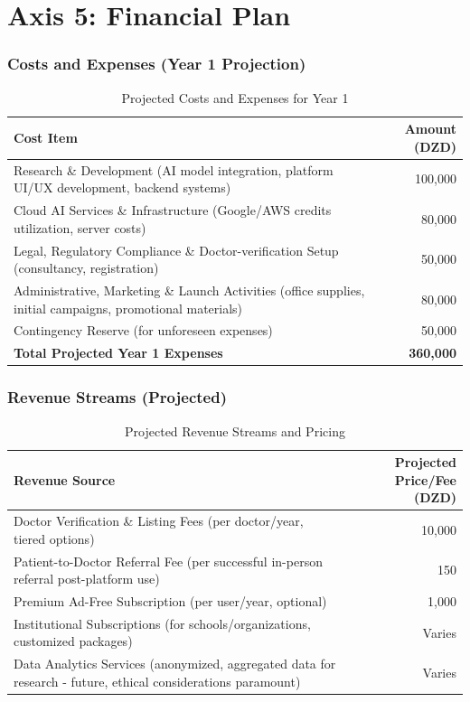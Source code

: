 \chapter{Axis 5: Financial Plan}

\subsection{Costs and Expenses (Year 1 Projection)}
\begin{table}[H]
  \centering
  \caption{Projected Costs and Expenses for Year 1}
  \label{tab:costs_expenses}
  \begin{tabularx}{\linewidth}{@{} X r @{}}
    \toprule
    \rowcolor{Gray}\textbf{Cost Item} & \textbf{Amount (DZD)} \\
    \midrule
    Research \& Development (AI model integration, platform UI/UX development, backend systems) & 100,000 \\
    Cloud AI Services \& Infrastructure (Google/AWS credits utilization, server costs) & 80,000  \\
    Legal, Regulatory Compliance \& Doctor-verification Setup (consultancy, registration) & 50,000  \\
    Administrative, Marketing \& Launch Activities (office supplies, initial campaigns, promotional materials) & 80,000  \\
    Contingency Reserve (for unforeseen expenses) & 50,000  \\
    \midrule
    \rowcolor{Gray}\textbf{Total Projected Year 1 Expenses} & \textbf{360,000} \\
    \bottomrule
  \end{tabularx}
\end{table}

\subsection{Revenue Streams (Projected)}
\begin{table}[H]
  \centering
  \caption{Projected Revenue Streams and Pricing}
  \label{tab:revenue_streams}
  \begin{tabularx}{\linewidth}{@{} X r @{}}
    \toprule
    \rowcolor{Gray}\textbf{Revenue Source} & \textbf{Projected Price/Fee (DZD)} \\
    \midrule
    Doctor Verification \& Listing Fees (per doctor/year, tiered options) & 10,000 \\
    Patient-to-Doctor Referral Fee (per successful in-person referral post-platform use) & 150 \\
    Premium Ad-Free Subscription (per user/year, optional) & 1,000  \\
    Institutional Subscriptions (for schools/organizations, customized packages) & Varies \\
    Data Analytics Services (anonymized, aggregated data for research - future, ethical considerations paramount) & Varies \\
    \bottomrule
  \end{tabularx}
\end{table}

